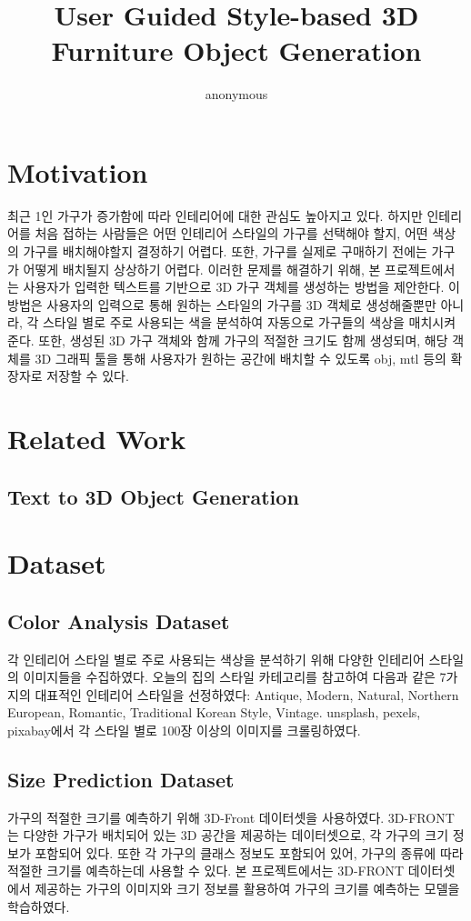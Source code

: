 \documentclass[11pt]{article}
\title{User Guided Style-based 3D Furniture Object Generation}
\author{anonymous}
\date{}
\begin{document}
\maketitle
\tableofcontents

\section{Motivation}
최근 1인 가구가 증가함에 따라 인테리어에 대한 관심도 높아지고 있다. 하지만 인테리어를 처음 접하는 사람들은 어떤 인테리어 스타일의 가구를 선택해야 할지, 어떤 색상의 가구를 배치해야할지 결정하기 어렵다. 또한, 가구를 실제로 구매하기 전에는 가구가 어떻게 배치될지 상상하기 어렵다. 이러한 문제를 해결하기 위해, 본 프로젝트에서는 사용자가 입력한 텍스트를 기반으로 3D 가구 객체를 생성하는 방법을 제안한다. 이 방법은 사용자의 입력으로 통해 원하는 스타일의 가구를 3D 객체로 생성해줄뿐만 아니라, 각 스타일 별로 주로 사용되는 색을 분석하여 자동으로 가구들의 색상을 매치시켜준다. 또한, 생성된 3D 가구 객체와 함께 가구의 적절한 크기도 함께 생성되며, 해당 객체를 3D 그래픽 툴을 통해 사용자가 원하는 공간에 배치할 수 있도록 obj, mtl 등의 확장자로 저장할 수 있다.

\section{Related Work}
\subsection{Text to 3D Object Generation}

\section{Dataset}
\subsection{Color Analysis Dataset}
각 인테리어 스타일 별로 주로 사용되는 색상을 분석하기 위해 다양한 인테리어 스타일의 이미지들을 수집하였다. 오늘의 집\cite{todayhouse}의 스타일 카테고리를 참고하여 다음과 같은 7가지의 대표적인 인테리어 스타일을 선정하였다: Antique, Modern, Natural, Northern European, Romantic, Traditional Korean Style, Vintage. unsplash\cite{unsplash}, pexels\cite{pexels}, pixabay\cite{pixabay}에서 각 스타일 별로 100장 이상의 이미지를 크롤링하였다.

\subsection{Size Prediction Dataset}
가구의 적절한 크기를 예측하기 위해 3D-Front\cite{fu20203dfront} 데이터셋을 사용하였다. 3D-FRONT는 다양한 가구가 배치되어 있는 3D 공간을 제공하는 데이터셋으로, 각 가구의 크기 정보가 포함되어 있다. 또한 각 가구의 클래스 정보도 포함되어 있어, 가구의 종류에 따라 적절한 크기를 예측하는데 사용할 수 있다. 본 프로젝트에서는 3D-FRONT 데이터셋에서 제공하는 가구의 이미지와 크기 정보를 활용하여 가구의 크기를 예측하는 모델을 학습하였다.
\end{document}
